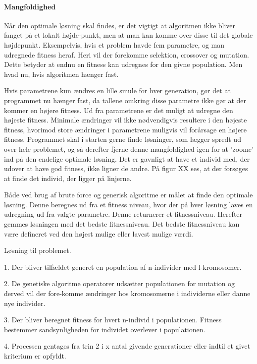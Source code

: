 \paragraph{Mangfoldighed}
Når den optimale løsning skal findes, er det vigtigt at algoritmen ikke bliver fanget på et lokalt højde-punkt, men at man kan komme over disse til det globale højdepunkt. Eksempelvis, hvis et problem havde fem parametre, og man udregnede fitness heraf. Heri vil der forekomme selektion, crossover og mutation. Dette betyder at endnu en fitness kan udregnes for den givne population. Men hvad nu, hvis algoritmen hænger fast. 

Hvis parametrene kun ændres en lille smule for hver generation, gør det at programmet nu hænger fast, da tallene omkring disse parametre ikke gør at der kommer en højere fitness. Ud fra parametrene er det muligt at udregne den højeste fitness. Minimale ændringer vil ikke nødvendigvis resultere i den højeste fitness, hvorimod store ændringer i parametrene muligvis vil forårsage en højere fitness. Programmet skal i starten gerne finde løsninger, som lægger spredt ud over hele problemet, og så derefter fjerne denne mangfoldighed igen for at ’zoome’ ind på den endelige optimale løsning. 
Det er gavnligt at have et individ med, der udover at have god fitness, ikke ligner de andre. På figur XX%
 ses, at der forsøges at finde det individ, der ligger på linjerne.

Både ved brug af brute force og generisk algoritme er målet at finde den optimale løsning. Denne beregnes ud fra et fitness niveau, hvor der på hver løsning laves en udregning ud fra valgte parametre. Denne returnerer et fitnessniveau. Herefter gemmes løsningen med det bedste fitnessniveau. Det bedste fitnessniveau kan være defineret ved den højest mulige eller lavest mulige værdi.

Løsning til problemet.

1.	Der bliver tilfældet generet en population af n-individer med l-kromosomer.


2.	De genetiske algoritme operatorer udsætter populationen for mutation og derved vil der fore-komme ændringer hos kromosomerne i individerne eller danne nye individer.


3.	Der bliver beregnet fitness for hvert n-individ i populationen. Fitness bestemmer sandsynligheden for individet overlever i populationen.


4.	Processen gentages fra trin 2 i x antal givende generationer eller indtil et givet kriterium er opfyldt.


